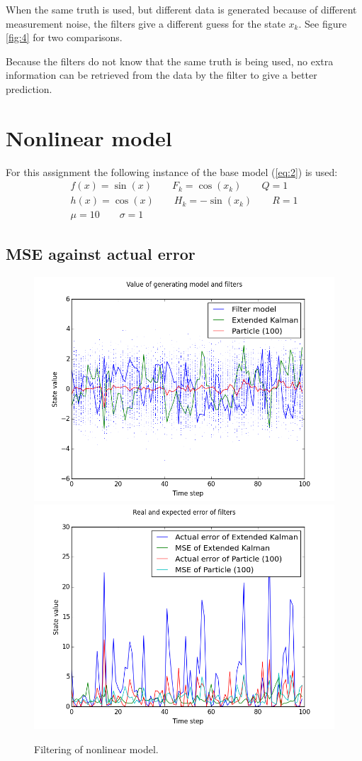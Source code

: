 \documentclass[paper=a4, fontsize=11pt]{scrartcl} %
\numberwithin{equation}{section} %
\numberwithin{figure}{section} %
\numberwithin{table}{section} %
\begin{document}
When the same truth is used, but different data is generated because of different measurement noise, the filters give a different guess for the state $x_k$. See figure \ref{fig:4} for two comparisons.

Because the filters do not know that the same truth is being used, no extra information can be retrieved from the data by the filter to give a better prediction.

\section{Nonlinear model}

For this assignment the following instance of the base model (\ref{eq:2}) is used:
\begin{eqnarray*}
	f(x) = \sin(x) \qquad F_k = \cos(x_k) \qquad Q = 1 \\
	h(x) = \cos(x) \qquad H_k = -\sin(x_k) \qquad R = 1 \\
	\mu = 10 \qquad \sigma = 1
\end{eqnarray*}

\subsection{MSE against actual error}

\begin{figure}
\centerline{
\includegraphics[width=.7\textwidth]{fig/figure_13}
\includegraphics[width=.7\textwidth]{fig/figure_14}}
\caption{Filtering of nonlinear model.}\label{fig:5}
\end{figure}
\end{document}
